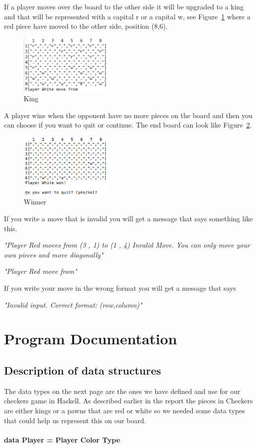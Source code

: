 \documentclass[12pt,a4paper]{article}
\begin{document}
If a player moves over the board to the other side it will be upgraded to a king and that will be represented with a capital r or a capital w, see Figure~\ref{fig6} where a red piece have moved to the other side, position (8,6).


\begin{figure}[htp]
\centering
\includegraphics[width= 0.4\textwidth]{queen.PNG}
\caption{King}
\label{fig6}
\end{figure}

A player wins when the opponent have no more pieces on the board and then you can choose if you want to quit or continue. The end board can look like Figure~\ref{fig7}.

\begin{figure}[htp]
\centering
\includegraphics[width= 0.4\textwidth]{victory.PNG}
\caption{Winner}
\label{fig7}
\end{figure}


If you write a move that is invalid you will get a message that says something like this.

\textit{"Player Red moves from (3 , 1) to (1 , 4)
Invalid Move. You can only move your own pieces and move diagonally"}

\textit{"Player Red move from"}

If you write your move in the wrong format you will get a message that says 

\textit{"Invalid input. Correct format: (row,column)"}




\section{Program Documentation}
\subsection{Description of data structures}
The data types on the next page are the ones we have defined and use for our checkers game in Haskell. As described earlier in the report the pieces in Checkers are either kings or a pawns that are red or white so we needed some data types that could help us represent this on our board.\\\\
\textbf{data Player = Player Color Type}
\end{document}

